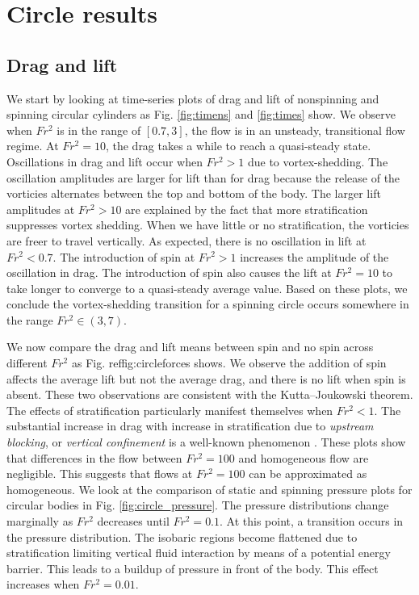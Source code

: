 \section{Circle results}
\label{section:Circle_results}
\subsection{Drag and lift}
We start by looking at time-series plots of drag and lift of nonspinning and spinning circular cylinders as Fig. \ref{fig:timens} and \ref{fig:times} show. We observe when $Fr^2$ is in the range of $[0.7, 3]$, the flow is in an unsteady, transitional flow regime. At $Fr^2 = 10$, the drag takes a while to reach a quasi-steady state. Oscillations in drag and lift occur when $Fr^2 > 1$ due to vortex-shedding. The oscillation amplitudes are larger for lift than for drag because the release of the vorticies alternates between the top and bottom of the body. The larger lift amplitudes at $Fr^2 > 10$ are explained by the fact that more stratification suppresses vortex shedding. When we have little or no stratification, the vorticies are freer to travel vertically. As expected, there is no oscillation in lift at $Fr^2 < 0.7$. The introduction of spin at $Fr^2 > 1$ increases the amplitude of the oscillation in drag. The introduction of spin also causes the lift at $Fr^2 = 10$ to take longer to converge to a quasi-steady average value. Based on these plots, we conclude the vortex-shedding transition for a spinning circle occurs somewhere in the range $Fr^2 \in (3,7)$. 

We now compare the drag and lift means between spin and no spin across different $Fr^2$ as Fig. ref{fig:circleforces} shows. We observe the addition of spin affects the average lift but not the average drag, and there is no lift when spin is absent. These two observations are consistent with the Kutta–Joukowski theorem. The effects of stratification particularly manifest themselves when $Fr^2 < 1$. The substantial increase in drag with increase in stratification due to \textit{upstream blocking}, or \textit{vertical confinement} is a well-known phenomenon \cite{deng_drag_2022, ortiz-tarin_stratified_2019}. These plots show that differences in the flow between $Fr^2 = 100$ and homogeneous flow are negligible. This suggests that flows at $Fr^2 = 100$ can be approximated as homogeneous. We look at the comparison of static and spinning pressure plots for circular bodies in Fig. \ref{fig:circle_pressure}. The pressure distributions change marginally as $Fr^2$ decreases until $Fr^2 = 0.1$. At this point, a transition occurs in the pressure distribution. The isobaric regions become flattened due to stratification limiting vertical fluid interaction by means of a potential energy barrier. This leads to a buildup of pressure in front of the body. This effect increases when $Fr^2 = 0.01$. 

